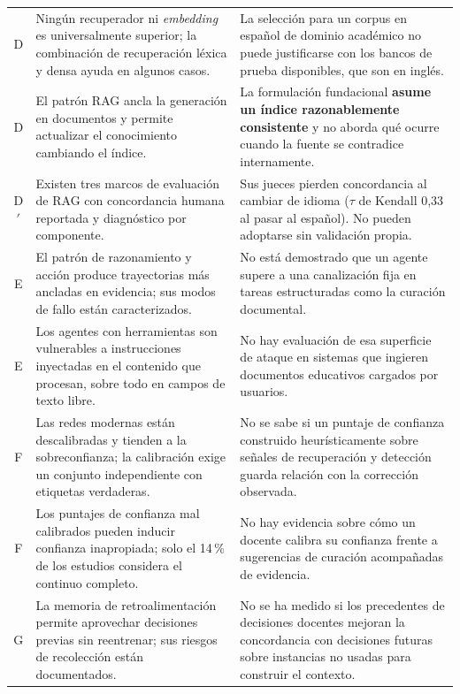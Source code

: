 \begin{xltabular}{\textwidth}{@{}c L{5.1cm} X@{}}
D &
Ningún recuperador ni \emph{embedding} es universalmente superior; la combinación de
recuperación léxica y densa ayuda en algunos casos. &
La selección para un corpus en español de dominio académico no puede justificarse con
los bancos de prueba disponibles, que son en inglés. \\

D &
El patrón RAG ancla la generación en documentos y permite actualizar el conocimiento
cambiando el índice. &
La formulación fundacional \textbf{asume un índice razonablemente consistente} y no
aborda qué ocurre cuando la fuente se contradice internamente. \\

D$'$ &
Existen tres marcos de evaluación de RAG con concordancia humana reportada y
diagnóstico por componente. &
Sus jueces pierden concordancia al cambiar de idioma ($\tau$ de Kendall 0,33 al pasar
al español). No pueden adoptarse sin validación propia. \\

E &
El patrón de razonamiento y acción produce trayectorias más ancladas en evidencia;
sus modos de fallo están caracterizados. &
No está demostrado que un agente supere a una canalización fija en tareas
estructuradas como la curación documental. \\

E &
Los agentes con herramientas son vulnerables a instrucciones inyectadas en el
contenido que procesan, sobre todo en campos de texto libre. &
No hay evaluación de esa superficie de ataque en sistemas que ingieren documentos
educativos cargados por usuarios. \\

F &
Las redes modernas están descalibradas y tienden a la sobreconfianza; la calibración
exige un conjunto independiente con etiquetas verdaderas. &
No se sabe si un puntaje de confianza construido heurísticamente sobre señales de
recuperación y detección guarda relación con la corrección observada. \\

F &
Los puntajes de confianza mal calibrados pueden inducir confianza inapropiada; solo
el 14\,\% de los estudios considera el continuo completo. &
No hay evidencia sobre cómo un docente calibra su confianza frente a sugerencias de
curación acompañadas de evidencia. \\

G &
La memoria de retroalimentación permite aprovechar decisiones previas sin
reentrenar; sus riesgos de recolección están documentados. &
No se ha medido si los precedentes de decisiones docentes mejoran la concordancia con
decisiones futuras sobre instancias no usadas para construir el contexto. \\


\end{xltabular}
